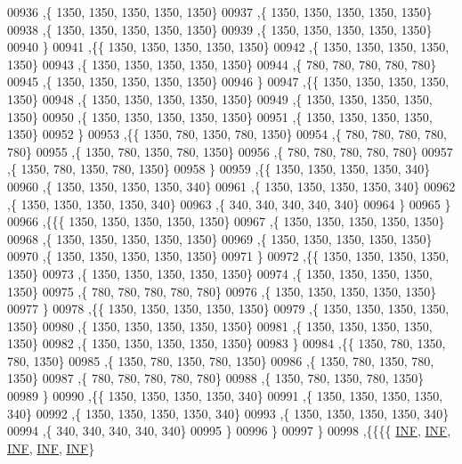 \begin{DoxyCode}
00936    ,\{  1350,  1350,  1350,  1350,  1350\}
00937    ,\{  1350,  1350,  1350,  1350,  1350\}
00938    ,\{  1350,  1350,  1350,  1350,  1350\}
00939    ,\{  1350,  1350,  1350,  1350,  1350\}
00940    \}
00941   ,\{\{  1350,  1350,  1350,  1350,  1350\}
00942    ,\{  1350,  1350,  1350,  1350,  1350\}
00943    ,\{  1350,  1350,  1350,  1350,  1350\}
00944    ,\{   780,   780,   780,   780,   780\}
00945    ,\{  1350,  1350,  1350,  1350,  1350\}
00946    \}
00947   ,\{\{  1350,  1350,  1350,  1350,  1350\}
00948    ,\{  1350,  1350,  1350,  1350,  1350\}
00949    ,\{  1350,  1350,  1350,  1350,  1350\}
00950    ,\{  1350,  1350,  1350,  1350,  1350\}
00951    ,\{  1350,  1350,  1350,  1350,  1350\}
00952    \}
00953   ,\{\{  1350,   780,  1350,   780,  1350\}
00954    ,\{   780,   780,   780,   780,   780\}
00955    ,\{  1350,   780,  1350,   780,  1350\}
00956    ,\{   780,   780,   780,   780,   780\}
00957    ,\{  1350,   780,  1350,   780,  1350\}
00958    \}
00959   ,\{\{  1350,  1350,  1350,  1350,   340\}
00960    ,\{  1350,  1350,  1350,  1350,   340\}
00961    ,\{  1350,  1350,  1350,  1350,   340\}
00962    ,\{  1350,  1350,  1350,  1350,   340\}
00963    ,\{   340,   340,   340,   340,   340\}
00964    \}
00965   \}
00966  ,\{\{\{  1350,  1350,  1350,  1350,  1350\}
00967    ,\{  1350,  1350,  1350,  1350,  1350\}
00968    ,\{  1350,  1350,  1350,  1350,  1350\}
00969    ,\{  1350,  1350,  1350,  1350,  1350\}
00970    ,\{  1350,  1350,  1350,  1350,  1350\}
00971    \}
00972   ,\{\{  1350,  1350,  1350,  1350,  1350\}
00973    ,\{  1350,  1350,  1350,  1350,  1350\}
00974    ,\{  1350,  1350,  1350,  1350,  1350\}
00975    ,\{   780,   780,   780,   780,   780\}
00976    ,\{  1350,  1350,  1350,  1350,  1350\}
00977    \}
00978   ,\{\{  1350,  1350,  1350,  1350,  1350\}
00979    ,\{  1350,  1350,  1350,  1350,  1350\}
00980    ,\{  1350,  1350,  1350,  1350,  1350\}
00981    ,\{  1350,  1350,  1350,  1350,  1350\}
00982    ,\{  1350,  1350,  1350,  1350,  1350\}
00983    \}
00984   ,\{\{  1350,   780,  1350,   780,  1350\}
00985    ,\{  1350,   780,  1350,   780,  1350\}
00986    ,\{  1350,   780,  1350,   780,  1350\}
00987    ,\{   780,   780,   780,   780,   780\}
00988    ,\{  1350,   780,  1350,   780,  1350\}
00989    \}
00990   ,\{\{  1350,  1350,  1350,  1350,   340\}
00991    ,\{  1350,  1350,  1350,  1350,   340\}
00992    ,\{  1350,  1350,  1350,  1350,   340\}
00993    ,\{  1350,  1350,  1350,  1350,   340\}
00994    ,\{   340,   340,   340,   340,   340\}
00995    \}
00996   \}
00997  \}
00998 ,\{\{\{\{   \mbox{\hyperlink{1_88_84__epars_8h_a12c2040f25d8e3a7b9e1c2024c618cb6}{INF}},   \mbox{\hyperlink{1_88_84__epars_8h_a12c2040f25d8e3a7b9e1c2024c618cb6}{INF}},   \mbox{\hyperlink{1_88_84__epars_8h_a12c2040f25d8e3a7b9e1c2024c618cb6}{INF}},   \mbox{\hyperlink{1_88_84__epars_8h_a12c2040f25d8e3a7b9e1c2024c618cb6}{INF}},   \mbox{\hyperlink{1_88_84__epars_8h_a12c2040f25d8e3a7b9e1c2024c618cb6}{INF}}\}

\end{DoxyCode}
